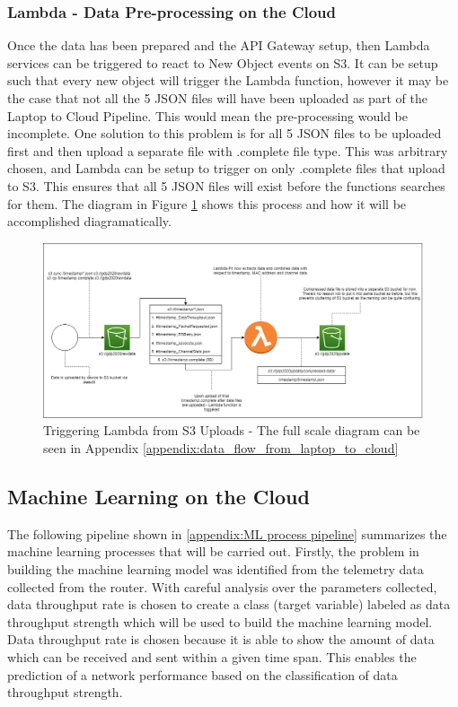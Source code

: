 \subsubsection{Lambda - Data Pre-processing on the Cloud}
\label{cloud_lambda}
Once the data has been prepared and the API Gateway setup, then Lambda services can be triggered to react to New Object events on S3. It can be setup such that every new object will trigger the Lambda function, however it may be the case that not all the 5 JSON files will have been uploaded as part of the Laptop to Cloud Pipeline. This would mean the pre-processing would be incomplete. One solution to this problem is for all 5 JSON files to be uploaded first and then upload a separate file with .complete file type. This was arbitrary chosen, and Lambda can be setup to trigger on only .complete files that upload to S3. This ensures that all 5 JSON files will exist before the functions searches for them. The diagram in Figure \ref{fig:s3_lambda_s3} shows this process and how it will be accomplished diagramatically.

\begin{figure}[ht]
    \centering
    \includegraphics[width=1\linewidth]{pages/Chapter3/Chapter 3 images/S3_to_Lambda_to_S3.png}
    \caption{Triggering Lambda from S3 Uploads - The full scale diagram can be seen in Appendix \ref{appendix:data_flow_from_laptop_to_cloud}}
    \label{fig:s3_lambda_s3}
\end{figure}

\subsection{Machine Learning on the Cloud}

The following pipeline shown in \ref{appendix:ML process pipeline} summarizes the machine learning processes that will be carried out.
Firstly, the problem in building the machine learning model was identified from the telemetry data collected from the router. With careful analysis over the parameters collected, data throughput rate is chosen to create a class (target variable) labeled as data throughput strength which will be used to build the machine learning model. Data throughput rate is chosen because it is able to show the amount of data which can be received and sent within a given time span. This enables the prediction of a network performance based on the classification of data throughput strength.

